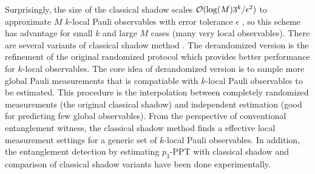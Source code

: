 \documentclass[
aps,
pra,
twocolumn,
floatfix,
]{revtex4-2}
\theoremstyle{plain}
\theoremstyle{definition}
\newcommand{\dm}{\rho}
\begin{document}
Surprisingly, the size of the classical shadow scales $\mathcal{O}(\log(M) 3^k/\epsilon^2)$ to approximate $M$ $k$-local Pauli observables with error tolerance $\epsilon$ \cite{huangPredictingManyProperties2020},
so this scheme has advantage for small $k$ and large $M$ cases (many very local observables).
There are several variants of classical shadow method \cite{hadfieldMeasurementsQuantumHamiltonians2022, huangEfficientEstimationPauli2021, chenRobustShadowEstimation2021}.
The derandomized version \cite{huangEfficientEstimationPauli2021} is the refinement of the original randomized protocol which provides better performance for $k$-local observables. 
The core idea of derandomized version is to sample more global Pauli measurements that is compatiable with $k$-local Pauli observables to be estimated.
This procedure is the interpolation between completely randomized measurements (the original classical shadow) and independent estimation (good for predicting few global observables).
From the perspective of conventional entanglement witness, the classical shadow method finds a effective local measurement settings for a generic set of $k$-local Pauli observables.
In addition, the entanglement detection by estimating $p_3$-PPT with classical shadow \cite{elbenMixedstateEntanglementLocal2020} and comparison of classical shadow variants \cite{zhangExperimentalQuantumState2021} have been done experimentally.
\end{document}
